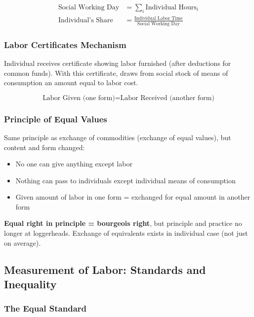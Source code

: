 \documentclass[12pt,a4paper]{article}
\begin{document}
\begin{align}
\text{Social Working Day} &= \sum_i \text{Individual Hours}_i \\
\text{Individual's Share} &= \frac{\text{Individual Labor Time}}{\text{Social Working Day}}
\end{align}

\subsubsection{Labor Certificates Mechanism}

Individual receives certificate showing labor furnished (after deductions for common funds). With this certificate, draws from social stock of means of consumption an amount equal to labor cost.

\begin{equation}
\text{Labor Given (one form)} = \text{Labor Received (another form)}
\end{equation}

\subsubsection{Principle of Equal Values}

Same principle as exchange of commodities (exchange of equal values), but content and form changed:

\begin{itemize}
\item No one can give anything except labor
\item Nothing can pass to individuals except individual means of consumption
\item Given amount of labor in one form = exchanged for equal amount in another form
\end{itemize}

\textbf{Equal right in principle = bourgeois right}, but principle and practice no longer at loggerheads. Exchange of equivalents exists in individual case (not just on average).

\subsection{Measurement of Labor: Standards and Inequality}

\subsubsection{The Equal Standard}
\end{document}
